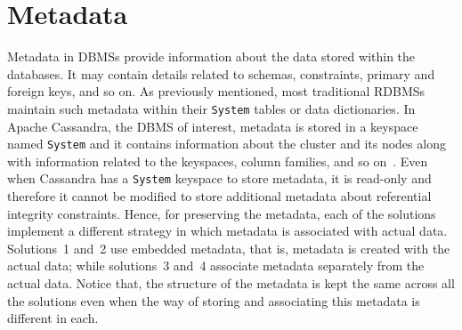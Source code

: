 \section{Metadata}\label{s:design-Metadata}
Metadata in \acp{DBMS} provide information about the data stored within the
databases.
It may contain details related to schemas, constraints,  primary and foreign
keys, and so on.   As previously mentioned,  most traditional \acp{RDBMS}
maintain such metadata within their \texttt{System}  tables or data
dictionaries.
In Apache Cassandra, the \ac{DBMS} of interest, metadata is stored in a keyspace
named \texttt{System} and it contains information about the cluster and its
nodes along with information related to the keyspaces, column families, and so
on~\citep{BOOK}.
 Even when Cassandra has a  \texttt{System} keyspace to store metadata, it is
 read-only and therefore it cannot be modified to store additional metadata
 about referential integrity constraints.
Hence,  for preserving the metadata, each of the solutions implement a 
different strategy in which metadata is associated with actual data. Solutions~1
and~2 use embedded metadata, that is, metadata is created with the actual
data; while solutions~3 and~4 associate metadata separately from
the actual data.  Notice that, the structure of the metadata is kept the same across all the solutions even when  the way of
 storing and associating this metadata is different in each.


